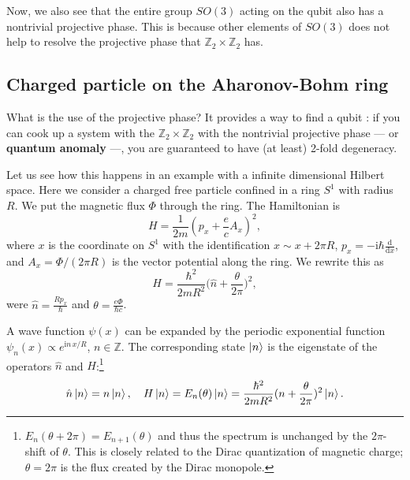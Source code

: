 \documentclass[
]{scrartcl}
\numberwithin{equation}{section}
\theoremstyle{definition}
\theoremstyle{definition}
\theoremstyle{definition}
\theoremstyle{definition}
\theoremstyle{remark}
\begin{document}
Now, we also see that the entire group \(SO(3)\) acting on the qubit also has a nontrivial projective phase. This is because other elements of \(SO(3)\) does not help to resolve the projective phase that \(\mathbb{Z}_2\times \mathbb{Z}_2\) has.

\hypertarget{charged-particle-on-the-aharonov-bohm-ring}{%
\subsection{Charged particle on the Aharonov-Bohm ring}\label{charged-particle-on-the-aharonov-bohm-ring}}

What is the use of the projective phase?
It provides a way to find a qubit : if you can cook up a system with the \(\mathbb{Z}_2\times \mathbb{Z}_2\) with the nontrivial projective phase --- or \textbf{quantum anomaly} ---, you are guaranteed to have (at least) 2-fold degeneracy.

Let us see how this happens in an example with a infinite dimensional Hilbert space.
Here we consider a charged free particle confined in a ring \(S^1\) with radius \(R\). We put the magnetic flux \(\Phi\) through the ring.
The Hamiltonian is
\begin{equation}
  \label{eq:ABringHam0}
  H = \frac{1}{2m}(p_x + \frac{e}{c}A_x)^2,
\end{equation}
where \(x\) is the coordinate on \(S^1\) with the identification \(x \sim x + 2\pi R\), \(p_x = -\mathrm{i}\hbar \frac{\mathrm{d}}{\mathrm{d}x}\), and \(A_x = \Phi/(2\pi R)\) is the vector potential along the ring.
We rewrite this as
\begin{equation}
  \label{eq:ABringHam1}
  H = \frac{\hbar^2}{2mR^2}\bigl(\hat{n} + \frac{\theta}{2\pi} \bigr)^2,
\end{equation}
were \(\hat{n} = \frac{R p_x}{\hbar}\) and \(\theta = \frac{e \Phi}{\hbar c}\).

A wave function \(\psi(x)\) can be expanded by the periodic exponential function \(\psi_n(x) \propto e^{\mathrm{i}n\,x/R}\), \(n \in \mathbb{Z}\). The corresponding state \(\ket{n}\) is the eigenstate of the operators \(\hat{n}\) and \(H\):\footnote{\(E_n(\theta+2\pi) = E_{n+1}(\theta)\) and thus the spectrum is unchanged by the \(2\pi\)-shift of \(\theta\). This is closely related to the Dirac quantization of magnetic charge; \(\theta =2\pi\) is the flux created by the Dirac monopole.}
\begin{equation}
  \label{eq:nEigen}
  \hat{n} \ket{n} = n \ket{n},
  \quad H \ket{n} = E_n(\theta) \ket{n} = \frac{\hbar^2}{2mR^2}(n+\frac{\theta}{2\pi})^2 \ket{n}.
\end{equation}
\end{document}
